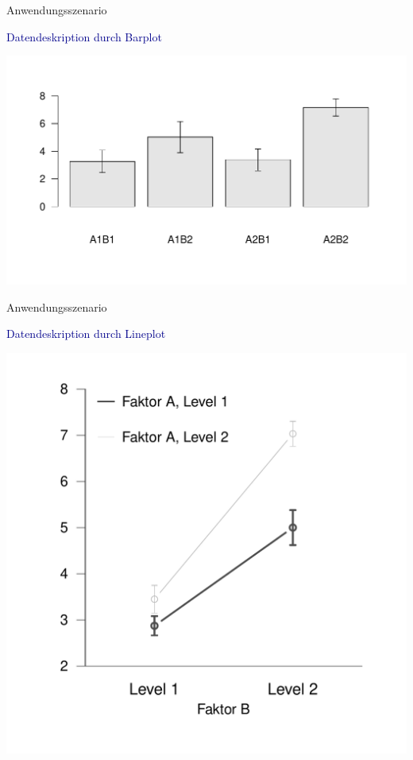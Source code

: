 \documentclass[
  8pt,
  ignorenonframetext,
]{beamer}
\begin{document}
\begin{frame}{Anwendungsszenario}
\protect\hypertarget{anwendungsszenario-6}{}
\vspace{1mm}

\textcolor{darkblue}{Datendeskription durch Barplot}

\vspace{3mm}
\center

\begin{center}\includegraphics[width=0.95\linewidth]{11_Abbildungen/alm_11_zva_barplot} \end{center}
\end{frame}

\begin{frame}{Anwendungsszenario}
\protect\hypertarget{anwendungsszenario-7}{}
\vspace{2mm}

\textcolor{darkblue}{Datendeskription durch Lineplot}

\vspace{3mm}
\center

\begin{center}\includegraphics[width=0.65\linewidth]{11_Abbildungen/alm_11_zva_lineplot} \end{center}
\end{frame}
\end{document}
